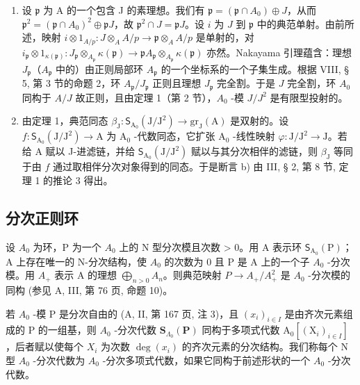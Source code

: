 \begin{enumerate}
\def\labelenumi{\alph{enumi})}
\item
  设 \(\mathfrak{p}\) 为 A 的一个包含 J 的素理想。我们有 \(\mathfrak{p} = (\mathfrak{p} \cap A_0) \oplus J\)，从而 \(\mathfrak{p}^2 = (\mathfrak{p} \cap A_0)^2 \oplus \mathfrak{p}J\)，故 \(\mathfrak{p}^2 \cap J = \mathfrak{p}J\)。设 \(i\) 为 \(J\) 到 \(\mathfrak{p}\) 中的典范单射。由前所述，映射 \(i \otimes 1_{A/p}: J \otimes_A A/p \longrightarrow \mathfrak{p} \otimes_A A/p\) 是单射的，对 \(i_{\mathfrak{p}} \otimes 1_{\kappa(\mathfrak{p})}: J_{\mathfrak{p}} \otimes_{A_{\mathfrak{p}}} \kappa(\mathfrak{p}) \longrightarrow \mathfrak{p}A_{\mathfrak{p}} \otimes_{A_{\mathfrak{p}}} \kappa(\mathfrak{p})\) 亦然。Nakayama 引理蕴含：理想 \(J_{\mathfrak{p}}\)（\(A_{\mathfrak{p}}\) 中的）由正则局部环 \(A_{\mathfrak{p}}\) 的一个坐标系的一个子集生成。根据 VIII, § 5, 第 3 节的命题 2，环 \(A_{\mathfrak{p}}/J_{\mathfrak{p}}\) 正则且理想 \(J_{\mathfrak{p}}\) 完全割。于是 \(J\) 完全割，环 \(A_0\) 同构于 \(A/J\) 故正则，且由定理 1（第 2 节），\(A_0\) -模 \(J/J^2\) 是有限型投射的。
\item
  由定理 1，典范同态 \(\beta_{\mathrm{J}}: \mathsf{S}_{\mathrm{A}_{0}}(\mathrm{J}/\mathrm{J}^{2}) \longrightarrow \mathrm{gr}_{\mathrm{J}}(\mathrm{A})\) 是双射的。设 \(f: \mathsf{S}_{\mathrm{A}_{0}}(\mathrm{J}/\mathrm{J}^{2}) \longrightarrow \mathrm{A}\) 为 \(\mathrm{A}_{0}\) -代数同态，它扩张 \(\mathrm{A}_{0}\) -线性映射 \(\varphi: \mathrm{J}/\mathrm{J}^{2} \longrightarrow \mathrm{J}\)。若给 A 赋以 J-进滤链，并给 \(\mathsf{S}_{\mathrm{A}_{0}}(\mathrm{J}/\mathrm{J}^{2})\) 赋以与其分次相伴的滤链，则 \(\beta_{\mathrm{J}}\) 等同于由 \(f\) 通过取相伴分次对象得到的同态。于是断言 b) 由 III, § 2, 第 8 节, 定理 1 的推论 3 得出。
\end{enumerate}

\subsection{分次正则环}

设 \(A_{0}\) 为环，P 为一个 \(A_{0}\) 上的 N 型分次模且次数 \textgreater{} 0。用 A 表示环 \(\mathsf{S}_{\mathrm{A}_{0}}(\mathrm{P})\)；A 上存在唯一的 N-分次结构，使 \(A_{0}\) 的次数为 0 且 P 是 A 上的一个子 \(A_{0}\) -分次模。用 \(A_{+}\) 表示 A 的理想 \(\bigoplus_{n>0} A_{n}\)。则典范映射 \(P \longrightarrow A_{+}/A_{+}^{2}\) 是 \(A_{0}\) -分次模的同构 (参见 A, III, 第 76 页, 命题 10)。

若 \(A_{0}\) -模 P 是分次自由的 (A, II, 第 167 页, 注 3)，且 \((x_{i})_{i\in I}\) 是由齐次元素组成的 P 的一组基，则 \(A_{0}\) -分次代数 \(\mathbf{S}_{\Lambda_{0}}(\mathbf{P})\) 同构于多项式代数 \(\mathrm{A}_{0}[(\mathrm{X}_{i})_{i\in I}]\)，后者赋以使每个 \(X_{i}\) 为次数 \(\deg(x_{i})\) 的齐次元素的分次结构。我们称每个 N 型 \(A_{0}\) -分次代数为 \(A_{0}\) -分次多项式代数，如果它同构于前述形状的一个 \(A_{0}\) -分次代数。

